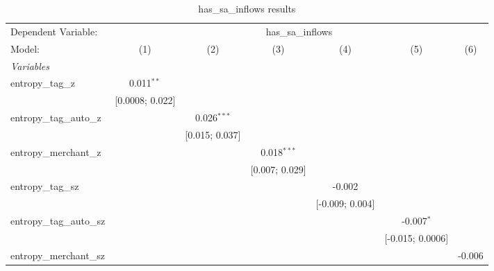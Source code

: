 
\begin{table}[htbp]
   \centering
   \tiny
   \begin{threeparttable}[b]
      \caption{\label{tab:reg_has_sa_inflows_full.tex} has\_sa\_inflows results}
      \begin{tabular}{lcccccc}
         \tabularnewline \midrule \midrule
         Dependent Variable: & \multicolumn{6}{c}{has\_sa\_inflows}\\
         Model:                    & (1)               & (2)              & (3)              & (4)              & (5)              & (6)\\  
         \midrule
         \emph{Variables}\\
         entropy\_tag\_z           & 0.011$^{**}$      &                  &                  &                  &                  &   \\   
                                   & [0.0008; 0.022]   &                  &                  &                  &                  &   \\   
         entropy\_tag\_auto\_z     &                   & 0.026$^{***}$    &                  &                  &                  &   \\   
                                   &                   & [0.015; 0.037]   &                  &                  &                  &   \\   
         entropy\_merchant\_z      &                   &                  & 0.018$^{***}$    &                  &                  &   \\   
                                   &                   &                  & [0.007; 0.029]   &                  &                  &   \\   
         entropy\_tag\_sz          &                   &                  &                  & -0.002           &                  &   \\   
                                   &                   &                  &                  & [-0.009; 0.004]  &                  &   \\   
         entropy\_tag\_auto\_sz    &                   &                  &                  &                  & -0.007$^{*}$     &   \\   
                                   &                   &                  &                  &                  & [-0.015; 0.0006] &   \\   
         entropy\_merchant\_sz     &                   &                  &                  &                  &                  & -0.006\\   

\end{tabular}
\end{threeparttable}
\end{table}
